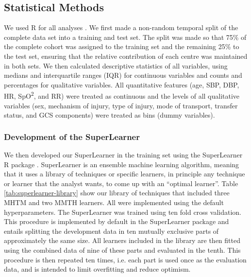 \documentclass[10pt,letterpaper]{article}\usepackage[]{graphicx}\usepackage[]{color}
\begin{document}
\subsection*{Statistical Methods}
We used R for all analyses \cite{R}. We first made a non-random temporal split
of the complete data set into a training and test set. The split was made so
that 75\% of the complete cohort was assigned to the training set and the
remaining 25\% to the test set, ensuring that the relative contribution of each
centre was maintained in both sets. We then calculated descriptive statistics of
all variables, using medians and interquartile ranges (IQR) for continuous
variables and counts and percentages for qualitative variables. All quantitative
features (age, SBP, DBP, HR, SpO\textsuperscript{2}, and RR) were treated as
continuous and the levels of all qualitative variables (sex, mechanism of
injury, type of injury, mode of transport, transfer status, and GCS components)
were treated as bins (dummy variables).

\subsubsection*{Development of the SuperLearner}
We then developed our SuperLearner in the training set using the SuperLearner R
package \cite{SuperLearner}. SuperLearner is an ensemble machine learning
algorithm, meaning that it uses a library of techniques or specific learners, in
principle any technique or learner that the analyst wants, to come up with an
``optimal learner''. Table \ref{tab:superlearner-library} show our library of
techniques that included three MHTM and two MMTH learners. All were implemented
using the default hyperparameters. The SuperLearner was trained using ten fold
cross validation. This procedure is implemented by default in the SuperLearner
package and entails splitting the development data in ten mutually exclusive
parts of approximately the same size. All learners included in the library are
then fitted using the combined data of nine of these parts and evaluated in the
tenth. This procedure is then repeated ten times, i.e. each part is used once as
the evaluation data, and is intended to limit overfitting and reduce optimism.
\end{document}
